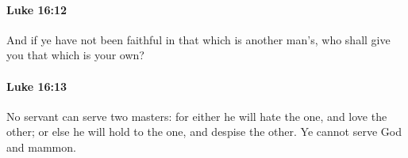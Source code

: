		\paragraph{Luke 16:12} %
			\label{LUKE-16-12}

			And if ye have not been faithful in that which is another man's, who shall give you that which is your own?

			\begin{framed}
			\scriptsize
				\begin{compactdesc}
					\item[SBLG] 
				\end{compactdesc}
			\end{framed}

		\paragraph{Luke 16:13} %
			\label{LUKE-16-13}

			No servant can serve two masters: for either he will hate the one, and love the other; or else he will hold to the one, and despise the other. Ye cannot serve God and mammon.

